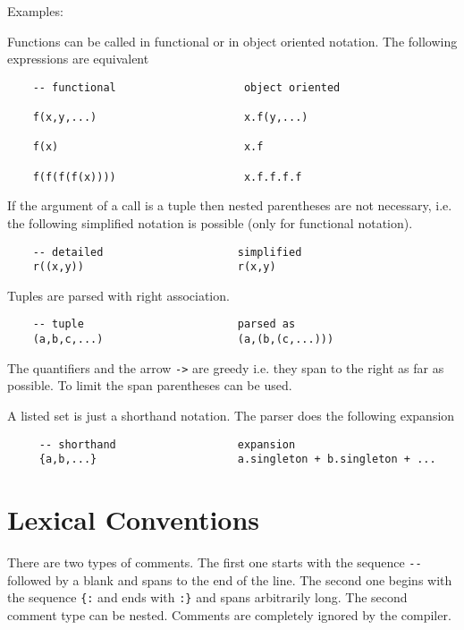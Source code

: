 \noindent Examples:

Functions can be called in functional or in object oriented notation. The
following expressions are equivalent

\begin{lstlisting}
    -- functional                    object oriented

    f(x,y,...)                       x.f(y,...)

    f(x)                             x.f

    f(f(f(f(x))))                    x.f.f.f.f
\end{lstlisting}

If the argument of a call is a tuple then nested parentheses are not
necessary, i.e. the following simplified notation is possible (only for
functional notation).

\begin{lstlisting}
    -- detailed                     simplified
    r((x,y))                        r(x,y)
\end{lstlisting}

Tuples are parsed with right association.
\begin{lstlisting}
    -- tuple                        parsed as
    (a,b,c,...)                     (a,(b,(c,...)))
\end{lstlisting}

The quantifiers and the arrow \lstinline!->! are greedy i.e. they span to the
right as far as possible. To limit the span parentheses can be used.

A listed set is just a shorthand notation. The parser does the following
expansion

\begin{lstlisting}
     -- shorthand                   expansion
     {a,b,...}                      a.singleton + b.singleton + ...
\end{lstlisting}


\section{Lexical Conventions} \label{lexconv}


There are two types of comments. The first one starts with the sequence
\lstinline!--! followed by a blank and spans to the end of the line. The
second one begins with the sequence \lstinline!{:! and ends with
  \lstinline!:}! and spans arbitrarily long. The second comment type can be
nested. Comments are completely ignored by the compiler.

